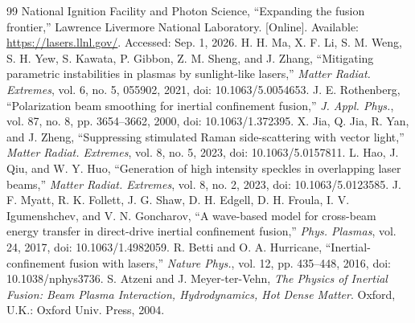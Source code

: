 \documentclass[conference]{../../../../Conference-LaTeX-template_10-17-19/IEEEtran}
\begin{document}
\begin{thebibliography}{99}
 National Ignition Facility and Photon Science, ``Expanding the fusion frontier,'' Lawrence Livermore National Laboratory. [Online]. Available: \url{https://lasers.llnl.gov/}. Accessed: Sep. 1, 2026.
 H. H. Ma, X. F. Li, S. M. Weng, S. H. Yew, S. Kawata, P. Gibbon, Z. M. Sheng, and J. Zhang, ``Mitigating parametric instabilities in plasmas by sunlight-like lasers,'' \emph{Matter Radiat. Extremes}, vol. 6, no. 5, 055902, 2021, doi: 10.1063/5.0054653.
 J. E. Rothenberg, ``Polarization beam smoothing for inertial confinement fusion,'' \emph{J. Appl. Phys.}, vol. 87, no. 8, pp. 3654--3662, 2000, doi: 10.1063/1.372395.
 X. Jia, Q. Jia, R. Yan, and J. Zheng, ``Suppressing stimulated Raman side-scattering with vector light,'' \emph{Matter Radiat. Extremes}, vol. 8, no. 5, 2023, doi: 10.1063/5.0157811.
 L. Hao, J. Qiu, and W. Y. Huo, ``Generation of high intensity speckles in overlapping laser beams,'' \emph{Matter Radiat. Extremes}, vol. 8, no. 2, 2023, doi: 10.1063/5.0123585.
 J. F. Myatt, R. K. Follett, J. G. Shaw, D. H. Edgell, D. H. Froula, I. V. Igumenshchev, and V. N. Goncharov, ``A wave-based model for cross-beam energy transfer in direct-drive inertial confinement fusion,'' \emph{Phys. Plasmas}, vol. 24, 2017, doi: 10.1063/1.4982059.
 R. Betti and O. A. Hurricane, ``Inertial-confinement fusion with lasers,'' \emph{Nature Phys.}, vol. 12, pp. 435--448, 2016, doi: 10.1038/nphys3736.
 S. Atzeni and J. Meyer-ter-Vehn, \emph{The Physics of Inertial Fusion: Beam Plasma Interaction, Hydrodynamics, Hot Dense Matter}. Oxford, U.K.: Oxford Univ. Press, 2004.
\end{thebibliography}
\end{document}
